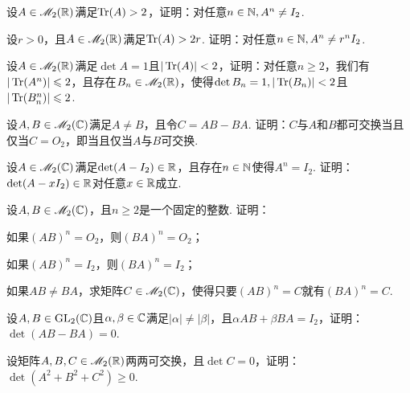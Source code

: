 \begin{problem}
  \begin{enumerate*}[label=(\alph*),listparindent=2em,itemjoin=\\]
    \item\label{prob2.47a} 设$A\in\mathscr M_2(\mathbb R)$满足$\operatorname{Tr}(A)>2$，证明：对任意$n\in\mathbb N,A^n\ne I_2$.
    \item  设$r>0$，且$A\in\mathscr M_2(\mathbb R)$满足$\operatorname{Tr}(A)>2r$. 证明：对任意$n\in\mathbb N,A^n\ne r^nI_2$.
  \end{enumerate*}
\end{problem}

\begin{problem}
  设$A\in\mathscr M_2(\mathbb R)$满足$\det A=1$且$|\operatorname{Tr}(A)|<2$，证明：对任意$n\ge2$，我们有$|\operatorname{Tr}(A^n)|\leqslant2$，且存在$B_n\in\mathscr M_2(\mathbb R)$，使得$\det B_n=1,|\operatorname{Tr}(B_n)|<2$且$|\operatorname{Tr}(B_n^n)|\leqslant2$.
\end{problem}

\begin{mybox}
  \begin{problem}
    设$A,B\in\mathscr M_2(\mathbb C)$满足$A\ne B$，且令$C=AB-BA$. 证明：$C$与$A$和$B$都可交换当且仅当$C=O_2$，即当且仅当$A$与$B$可交换.
  \end{problem}
\end{mybox}

\begin{problem}
  设$A\in\mathscr M_2(\mathbb C)$满足$\det(A-I_2)\in\mathbb R$，且存在$n\in\mathbb N$使得$A^n=I_2$. 证明：$\det(A-xI_2)\in\mathbb R$对任意$x\in\mathbb R$成立.
\end{problem}

\begin{problem}
  设$A,B\in\mathscr M_2(\mathbb C)$，且$n\ge2$是一个固定的整数. 证明：
  \begin{enum}
    \item 如果$(AB)^n=O_2$，则$(BA)^n=O_2$；
    \item 如果$(AB)^n=I_2$，则$(BA)^n=I_2$；
    \item 如果$AB\ne BA$，求矩阵$C\in\mathscr M_2(\mathbb C)$，使得只要$(AB)^n=C$就有$(BA)^n=C$.
  \end{enum}
\end{problem}

\begin{problem}
  设$A,B\in\operatorname{GL}_2(\mathbb C)$且$\alpha,\beta\in\mathbb C$满足$|\alpha|\ne|\beta|$，且$\alpha AB+\beta BA=I_2$，证明：$\det(AB-BA)=0$.
\end{problem}

\begin{problem}
  设矩阵$A,B,C\in\mathscr M_2(\mathbb R)$两两可交换，且$\det C=0$，证明：$\det(A^2+B^2+C^2)\ge0$.
\end{problem}

